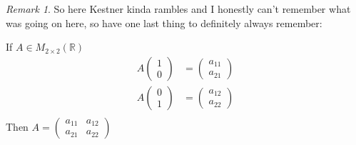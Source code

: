 \documentclass{report}
\theoremstyle{remark}
\newtheorem{remark}[theorem]{Remark}
\theoremstyle{definition}
\theoremstyle{definition}
\theoremstyle{theorem}
\begin{document}
\begin{remark}
So here Kestner kinda rambles and I honestly can't remember what was going on here, so have one last thing to definitely always remember:
\end{remark}
If $A \in M_{2 \times 2}(\mathbb{R})$
\begin{align*}A \begin{pmatrix}1 \\ 0\end{pmatrix} &= \begin{pmatrix} a_{11} \\ a_{21} \end{pmatrix}\\
A \begin{pmatrix}0 \\ 1\end{pmatrix} &= \begin{pmatrix} a_{12} \\ a_{22} \end{pmatrix}\\
\end{align*}
Then $A = \begin{pmatrix} a_{11} & a_{12} \\ a_{21} & a_{22} \end{pmatrix}$
\end{document}
